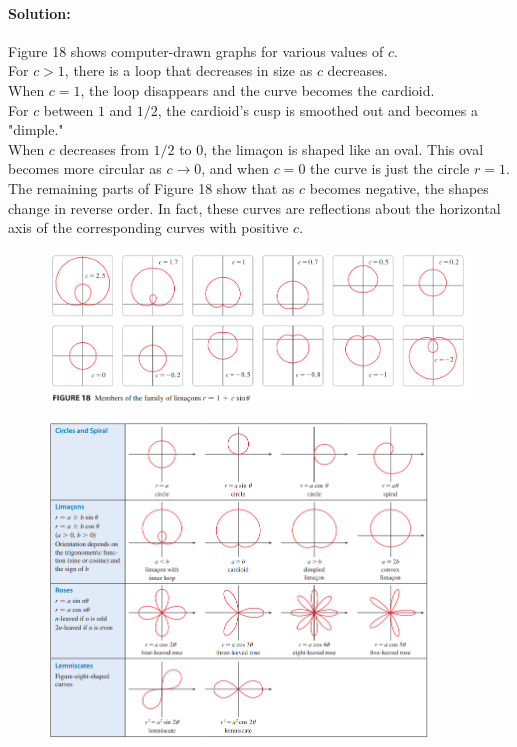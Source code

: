 \documentclass{article}
\begin{document}
\paragraph{Solution:} Figure 18 shows computer-drawn graphs for various values of $c$. 
\\For $c>1$, there is a loop that decreases in size as $c$ decreases. 
\\When $c=1$, the loop disappears and the curve becomes the cardioid. 
\\For $c$ between $1$ and $1/2$, the cardioid's cusp is smoothed out and becomes a "dimple." 
\\When $c$ decreases from $1/2$ to $0$, the limaçon is shaped like an oval. This oval becomes more circular as $c \to 0$, and when $c=0$ the curve is just the circle $r=1$. 
\\The remaining parts of Figure 18 show that as $c$ becomes negative, the shapes change in reverse order. In fact, these curves are reflections about the horizontal axis of the corresponding curves with positive $c$.
\begin{figure}[htbp]
    \centering
    \includegraphics[width=1\textwidth]{graph42.png}
\end{figure}

\begin{figure}[htbp]
    \centering
    \includegraphics[width=0.9\textwidth]{graph43.png}
\end{figure}
\end{document}
